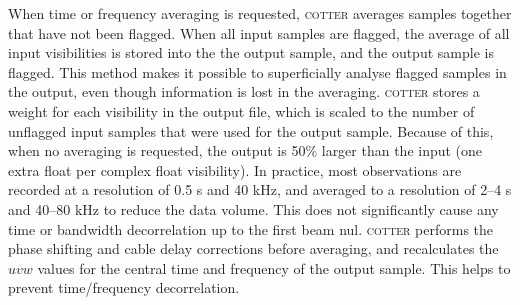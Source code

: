 \documentclass{pasa}
\begin{document}
When time or frequency averaging is requested, \textsc{cotter} averages samples together that have not been flagged. When all input samples are flagged, the average of all input visibilities is stored into the the output sample, and the output sample is flagged. This method makes it possible to superficially analyse flagged samples in the output, even though information is lost in the averaging. \textsc{cotter} stores a weight for each visibility in the output file, which is scaled to the number of unflagged input samples that were used for the output sample. Because of this, when no averaging is requested, the output is 50\% larger than the input (one extra float per complex float visibility). In practice, most observations are recorded at a resolution of 0.5 s and 40 kHz, and averaged to a resolution of 2--4 s and 40--80 kHz to reduce the data volume. This does not significantly cause any time or bandwidth decorrelation up to the first beam nul. \textsc{cotter} performs the phase shifting and cable delay corrections before averaging, and recalculates the $uvw$ values for the central time and frequency of the output sample. This helps to prevent time/frequency decorrelation.
\end{document}
